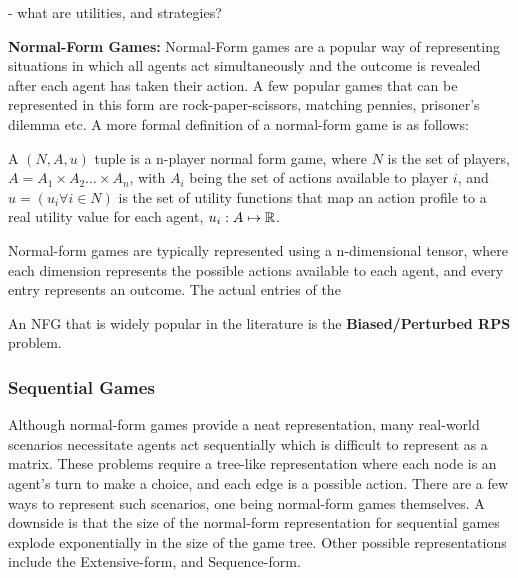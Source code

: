 - what are utilities, and strategies?

\textbf{Normal-Form Games:}
Normal-Form games are a popular way of representing situations in which all agents act
simultaneously and the outcome is revealed after each agent has taken their action.
A few popular games that can be represented in this form are rock-paper-scissors, matching pennies,
prisoner's dilemma etc. A more formal definition of a normal-form game is as follows:

\begin{definition}

	A $(N, A, u)$ tuple
	is a n-player normal form game, where $N$ is the set of players, $A = A_1 \times A_2 \ldots \times
		A_n$, with $A_i$ being the set of actions available to player $i$, and $u = (u_i \forall i \in N)$
	is the set of utility functions that map an action profile to a real utility value for each agent,
	$u_i: A \mapsto \mathbb{R}$.

\end{definition}

Normal-form games are typically represented using a n-dimensional tensor, where each dimension
represents the possible actions available to each agent, and every entry represents an outcome.
The actual entries of the

An NFG that is widely popular in the literature is
the \textbf{Biased/Perturbed RPS} problem.

\subsubsection*{Sequential Games}

Although normal-form games provide a neat representation, many real-world scenarios necessitate
agents act sequentially which is difficult to represent as a matrix.
These problems require a tree-like representation where each node is an agent's turn to make a
choice, and each edge is a possible action.
There are a few ways to represent such scenarios, one being normal-form games themselves.
A downside is that the size of the normal-form representation for sequential games explode
exponentially in the size of the game tree.
Other possible representations include the Extensive-form, and Sequence-form.

\begin{definition}
\end{definition}

\begin{definition}
\end{definition}

